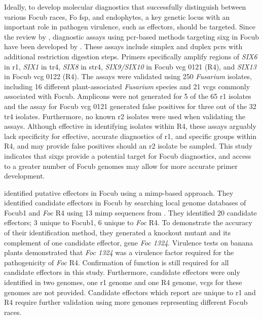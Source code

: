 Ideally, to develop molecular diagnostics that successfully distinguish between various \ac{Focub} races, \ac{Fo} \ac{fsp}, and endophytes, a key genetic locus with an important role in pathogen virulence, such as effectors, should be targeted. Since the review by \textcite{Magdama2019}, diagnostic assays using \ac{pcr}-based methods targeting \ac{sixg} in \ac{Focub} have been developed by \textcite{Carvalhais2019}. These assays include simplex and duplex \acp{pcr} with additional restriction digestion steps. Primers specifically amplify regions of \textit{SIX6} in \ac{r1}, \textit{SIX1} in \ac{tr4}, \textit{SIX8} in \ac{str4}, \textit{SIX9/SIX10} in \ac{Focub} \ac{vcg} 0121 (R4), and \textit{SIX13} in \ac{Focub} \ac{vcg} 0122 (R4). The assays were validated using 250 \textit{Fusarium} isolates, including 16 different plant-associated \textit{Fusarium} species and 21 \acp{vcg}  commonly associated with \ac{Focub}. Amplicons were not generated for 5 of the 65 \ac{r1} isolates and the assay for \ac{Focub} \ac{vcg} 0121 generated false positives for three out of the 32 \ac{tr4} isolates. Furthermore, no known \ac{r2} isolates were used when validating the assays. Although effective in identifying isolates within R4, these assays arguably lack specificity for effective, accurate diagnostics of \ac{r1}, and specific groups within R4, and may provide false positives should an \ac{r2} isolate be sampled. This study indicates that \acp{sixg} provide a potential target for \ac{Focub} diagnostics, and access to a greater number of \ac{Focub} genomes may allow for more accurate primer development.  

\textcite{Chang2020} identified putative effectors in \ac{Focub} using a \ac{mimp}-based approach. They identified candidate effectors in \ac{Focub} by searching local genome databases of \ac{Focub1} and \textit{Foc} R4 using 13 \ac{mimp} sequences from \textcite{Dam2016}. They identified 20 candidate effectors; 3 unique to \ac{Focub1}, 6 unique to \textit{Foc} R4. To demonstrate the accuracy of their identification method, they generated a knockout mutant and its complement of one candidate effector, gene \textit{Foc 1324}. Virulence tests on banana plants demonstrated that \textit{Foc 1324} was a virulence factor required for the pathogenicity of \textit{Foc} R4. Confirmation of function is still required for all candidate effectors in this study. Furthermore, candidate effectors were only identified in two genomes, one \ac{r1} genome and one R4 genome, \acp{vcg} for these genomes are not provided. Candidate effectors which \textcite{Chang2020} report are unique to \ac{r1} and R4 require further validation using more genomes representing different \ac{Focub} races.

